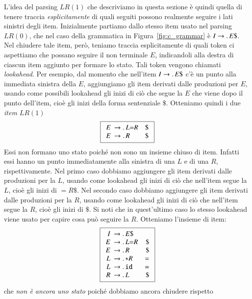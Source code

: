L'idea del parsing $\mathit{LR}(1)$
che descriviamo in questa sezione \`e quindi
quella di tenere traccia \emph{esplicitamente} di quali seguiti possono
realmente seguire i lati sinistri degli item. Inizialmente partiamo
dallo stesso item usato nel parsing $\mathit{LR}(0)$,
che nel caso della grammatica
in Figura~\ref{fig:c_grammar} \`e $I\to.\, E\mathtt{\$}$. Nel chiudere tale
item, per\`o, teniamo traccia esplicitamente di quali token ci aspettiamo
che possano seguire il non terminale $E$, indicandoli alla destra di
ciascun item aggiunto per formare lo stato. Tali token vengono chiamati
\emph{lookahead}. Per esempio, dal momento che
nell'item $I\to.\, E\mathtt{\$}$ c'\`e un punto alla immediata sinistra
della $E$, aggiungiamo gli item derivati dalle produzioni per $E$,
usando come possibili lookahead gli inizi di ci\`o che segue la $E$ che
viene dopo il punto dell'item,
cio\`e gli inizi della forma sentenziale $\mathtt{\$}$. Otteniamo quindi
i due \emph{item $\mathit{LR}(1)$}
%
\[
  \fbox{$\begin{array}{rlr}
     E \!\!\!& \to.\, L\mathtt{=}R & \mathtt{\$}\\
     E \!\!\!& \to.\, R & \mathtt{\$}
  \end{array}$}
\]
%
Essi non formano uno stato poich\'e non sono un insieme chiuso di item.
Infatti essi hanno un punto immediatamente alla
sinistra di una $L$ e di una $R$, rispettivamente. Nel primo caso dobbiamo
aggiungere gli item derivati dalle produzioni per la $L$, usando come lookahead
gli inizi di ci\`o che nell'item segue la $L$, cio\`e gli inizi di
$\mathtt{=}R\mathtt{\$}$. Nel secondo caso dobbiamo aggiungere
gli item derivati dalle produzioni per la $R$, usando come lookahead
gli inizi di ci\`o che nell'item segue la $R$, cio\`e gli inizi
di $\mathtt{\$}$. Si noti che in quest'ultimo caso lo stesso lookahead
viene usato per capire cosa pu\`o seguire la $R$. Otteniamo l'insieme di item:
%
\[
  \fbox{$\begin{array}{rlr}
     I \!\!\!& \to\idot E\mathtt{\$}\\
     E \!\!\!& \to\idot L\mathtt{=}R & \mathtt{\$}\\
     E \!\!\!& \to\idot R & \mathtt{\$}\\
     L \!\!\!& \to\idot \mathtt{*}R & \mathtt{=}\\
     L \!\!\!& \to\idot \mathtt{id} & \mathtt{=}\\
     R \!\!\!& \to\idot L & \mathtt{\$}
  \end{array}$}
\]
%
che \emph{non \`e ancora uno stato} poich\'e dobbiamo ancora chiudere rispetto
